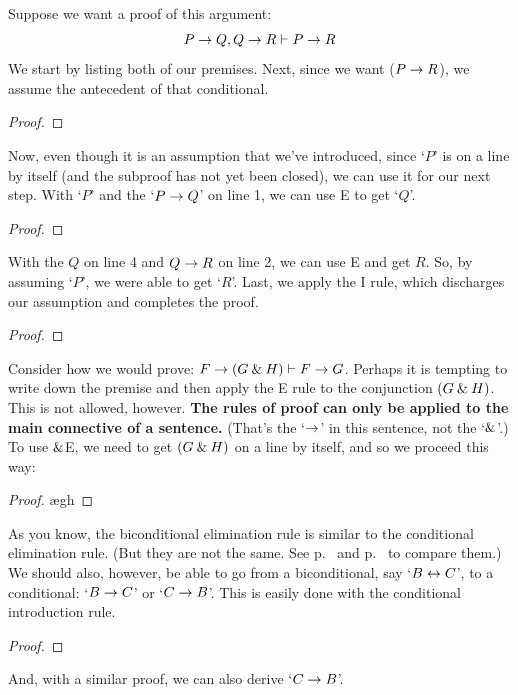\begin{earg}
\item Suppose we want a proof of this argument:
	$$P \rightarrow Q, Q \rightarrow R \vdash P \rightarrow R$$
We start by listing both of our premises. Next, since we want ($P \rightarrow R$), we assume the antecedent of that conditional. 
\begin{proof}
	 \pr{}
	 \pr{}
	\open
		 \as{}
	\close
\end{proof}
Now, even though it is an assumption that we've introduced, since `$P$' is on a line by itself (and the subproof has not yet been closed), we can use it for our next step. With `$P$' and the `$P \rightarrow Q$' on line 1, we can use {\eif}E to get `$Q$'. 
\begin{proof}
	 \pr{}
	 \pr{}
	\open
		\as{}
	\close
\end{proof}
With the $Q$ on line 4 and $Q \rightarrow R$ on line 2, we can use {\eif}E and get $R$. So, by assuming `$P$', we were able to get `$R$'. Last, we apply the {\eif}I rule, which discharges our assumption and completes the proof.
\label{HSproof}
\begin{proof}
	 \pr{}
	 \pr{}
	\open
		\as{}
	\close
\end{proof}

\item Consider how we would prove: $F \rightarrow (G \mathbin{\&} H) \vdash F \rightarrow G$. Perhaps it is tempting to write down the premise and then apply the {\eand}E rule to the conjunction $(G \mathbin{\&} H)$. This is not allowed, however. \textbf{The rules of proof can only be applied to the main connective of a sentence.} (That's the `$\rightarrow$' in this sentence, not the `$\mathbin{\&}$'.) To use $\mathbin{\&}$E, we need to get $(G \mathbin{\&} H)$ on a line by itself, and so we proceed this way:

\begin{proof}
	 \pr{}
	\open
		\as{}
		\ae{gh}
	\close
\end{proof}

\item As you know, the biconditional elimination rule is similar to the conditional elimination rule. (But they are not the same. See p.~\pageref{ce-rule} and p.~\pageref{be-rule} to compare them.) We should also, however, be able to go from a biconditional, say `$B \leftrightarrow C$', to a conditional: `$B \rightarrow C$' or `$C \rightarrow B$'. This is easily done with the conditional introduction rule.
\begin{proof}
	 \pr{}
	\open
		\as{}
	\close
\end{proof}
\smallskip
\noindent And, with a similar proof, we can also derive `$C \rightarrow B$'.


\end{earg}
